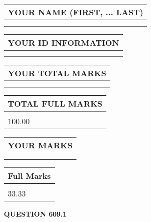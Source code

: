 \documentclass{ctexart}
\begin{document}
   
   
   
\newpage 
\setcounter{page}{ 
   609001 } 
   
   
   
   
\noindent\begin{tabular}{|l|}
\hline
YOUR NAME (FIRST, ... LAST)  \\
\hline
 \\ 
 \\ 
\hline
\end{tabular}
\hspace{0.05in} \begin{tabular}{|l|}
\hline
 YOUR   ID   INFORMATION  \\
\hline
 \\ 
 \\ 
\hline
\end{tabular}
   
   
\vspace{0.2in}\noindent\begin{tabular}{|l|}
\hline
YOUR TOTAL MARKS  \\
\hline
 \\ 
 \\ 
\hline
\end{tabular}
\hspace{0.05in} \begin{tabular}{|l|}
\hline
TOTAL FULL MARKS  \\
\hline
 \\ 
100.00 \\
\hline
\end{tabular}
   
   
 \vspace{0.2in}
 
 
 
 
   
   
  
\vspace{0.2in}
  
\noindent\begin{tabular}{|l|}
\hline
 YOUR MARKS  \\
\hline
 \\ 
 \\ 
\hline
\end{tabular}
\hspace{0.05in} \begin{tabular}{|l|}
\hline
 Full Marks  \\
\hline
 \\ 
33.33 \\
\hline
\end{tabular}
{\textbf{\Large{QUESTION
609.1 
}}}
  
\end{document}
